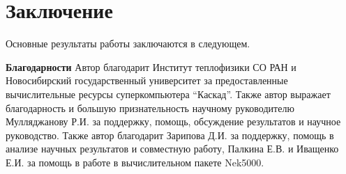 \chapter*{Заключение}                       %


Основные результаты работы заключаются в следующем.



\textbf{Благодарности} 
Автор благодарит Институт теплофизики СО РАН и Новосибирский государственный университет за 
предоставленные вычислительные ресурсы суперкомпьютера ``Каскад''.
Также автор выражает благодарность и большую признательность научному руководителю
Мулляджанову Р.И. за поддержку, помощь, обсуждение результатов и научное руководство.
Также автор благодарит Зарипова Д.И. за поддержку, помощь в анализе научных результатов и 
совместную работу, Палкина Е.В. и Иващенко Е.И. за помощь в работе в вычислительном пакете Nek5000.